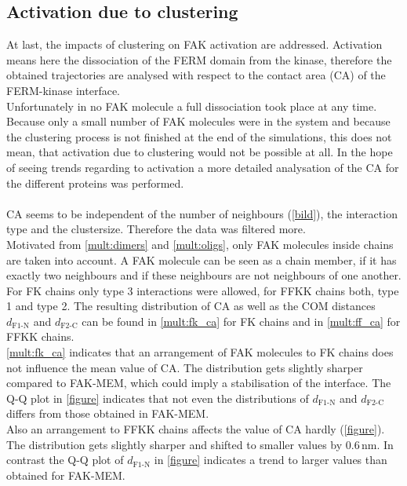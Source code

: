 \subsection{Activation due to clustering}
At last, the impacts of clustering on FAK activation are addressed. Activation means here the dissociation of the FERM domain from the kinase, therefore the obtained trajectories are analysed with respect to the contact area (CA) of the FERM-kinase interface.\\
Unfortunately in no FAK molecule a full dissociation took place at any time. Because only a small number of FAK molecules were in the system and because the clustering process is not finished at the end of the simulations, this does not mean, that activation due to clustering would not be possible at all. In the hope of seeing trends regarding to activation a more detailed analysation of the CA for the different proteins was performed.\\
\\
CA seems to be independent of the number of neighbours (\autoref{bild}), the interaction type and the clustersize. Therefore the data was filtered more.\\
Motivated from \autoref{mult:dimers} and \autoref{mult:oligs}, only FAK molecules inside chains are taken into account. A FAK molecule can be seen as a chain member, if it has exactly two neighbours and if these neighbours are not neighbours of one another. For FK chains only type 3 interactions were allowed, for FFKK chains both, type 1 and type 2. The resulting distribution of CA as well as the COM distances $d_\text{F1-N}$ and $d_\text{F2-C}$ can be found in \autoref{mult:fk_ca} for FK chains and in \autoref{mult:ff_ca} for FFKK chains.\\
\autoref{mult:fk_ca} indicates that an arrangement of FAK molecules to FK chains does not influence the mean value of CA. The distribution gets slightly sharper compared to FAK-MEM, which could imply a stabilisation of the interface. The Q-Q plot in \autoref{figure} indicates that not even the distributions of $d_\text{F1-N}$ and $d_\text{F2-C}$ differs from those obtained in FAK-MEM.\\
Also an arrangement to FFKK chains affects the value of CA hardly (\autoref{figure}). The distribution gets slightly sharper and shifted to smaller values by $0.6\,\si{\nano\metre}$. In contrast the Q-Q plot of $d_\text{F1-N}$ in \autoref{figure} indicates a trend to larger values than obtained for FAK-MEM.\\
\\
